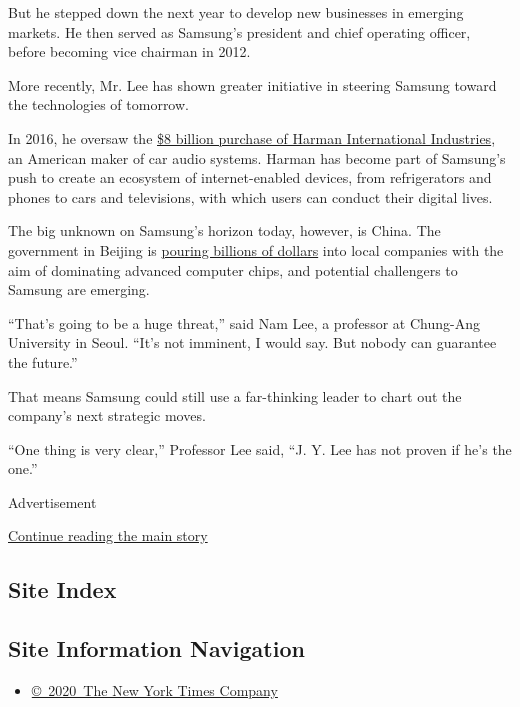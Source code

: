 But he stepped down the next year to develop new businesses in emerging
markets. He then served as Samsung's president and chief operating
officer, before becoming vice chairman in 2012.

More recently, Mr. Lee has shown greater initiative in steering Samsung
toward the technologies of tomorrow.

In 2016, he oversaw the
\href{https://www.nytimes3xbfgragh.onion/2016/11/15/business/samsung-auto-industry-harman-automotive.html}{\$8
billion purchase of Harman International Industries}, an American maker
of car audio systems. Harman has become part of Samsung's push to create
an ecosystem of internet-enabled devices, from refrigerators and phones
to cars and televisions, with which users can conduct their digital
lives.

The big unknown on Samsung's horizon today, however, is China. The
government in Beijing is
\href{https://www.nytimes3xbfgragh.onion/2017/11/07/business/made-in-china-technology-trade.html}{pouring
billions of dollars} into local companies with the aim of dominating
advanced computer chips, and potential challengers to Samsung are
emerging.

``That's going to be a huge threat,'' said Nam Lee, a professor at
Chung-Ang University in Seoul. ``It's not imminent, I would say. But
nobody can guarantee the future.''

That means Samsung could still use a far-thinking leader to chart out
the company's next strategic moves.

``One thing is very clear,'' Professor Lee said, ``J. Y. Lee has not
proven if he's the one.''

Advertisement

\protect\hyperlink{after-bottom}{Continue reading the main story}

\hypertarget{site-index}{%
\subsection{Site Index}\label{site-index}}

\hypertarget{site-information-navigation}{%
\subsection{Site Information
Navigation}\label{site-information-navigation}}

\begin{itemize}
\tightlist
\item
  \href{https://help.nytimes3xbfgragh.onion/hc/en-us/articles/115014792127-Copyright-notice}{©~2020~The
  New York Times Company}
\end{itemize}

